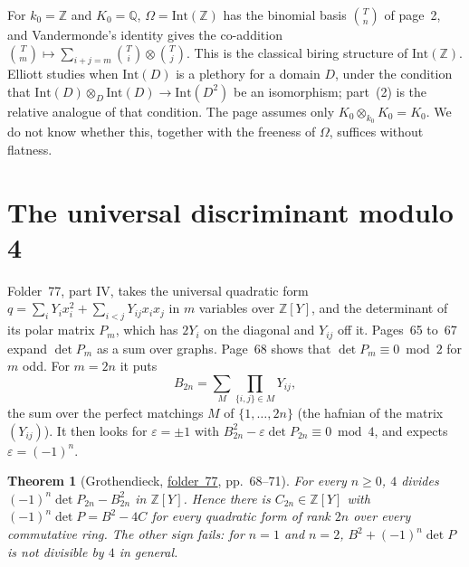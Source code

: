 \documentclass[11pt,a4paper]{amsart}
\newtheorem{theorem}{Theorem}[section]
\theoremstyle{definition}
\theoremstyle{remark}
\newcommand{\Z}{\mathbb Z}
\newcommand{\Q}{\mathbb Q}
\newcommand{\fac}[1]{\href{https://grothendieck.umontpellier.fr/#1.pdf}{folder~#1}}
\begin{document}
For $k_0 = \Z$ and $K_0 = \Q$, $\Omega = \mathrm{Int}(\Z)$ has the binomial basis $\binom Tn$ of page~2, and Vandermonde's identity gives the co-addition $\binom{T}{m} \mapsto \sum_{i+j=m}\binom Ti \otimes \binom Tj$. This is the classical biring structure of $\mathrm{Int}(\Z)$. Elliott \cite{elliott2010} studies when $\mathrm{Int}(D)$ is a plethory for a domain $D$, under the condition that $\mathrm{Int}(D) \otimes_D \mathrm{Int}(D) \to \mathrm{Int}(D^2)$ be an isomorphism; part~(2) is the relative analogue of that condition. The page assumes only $K_0 \otimes_{k_0} K_0 = K_0$. We do not know whether this, together with the freeness of $\Omega$, suffices without flatness.

\section{The universal discriminant modulo 4}\label{sec:disc}

Folder~77, part IV, takes the universal quadratic form $q = \sum_i Y_ix_i^2 + \sum_{i<j}Y_{ij}x_ix_j$ in $m$ variables over $\Z[Y]$, and the determinant of its polar matrix $P_m$, which has $2Y_i$ on the diagonal and $Y_{ij}$ off it. Pages~65 to~67 expand $\det P_m$ as a sum over graphs. Page~68 shows that $\det P_m \equiv 0 \bmod 2$ for $m$ odd. For $m = 2n$ it puts
\[
B_{2n} = \sum_M \prod_{\{i,j\} \in M} Y_{ij},
\]
the sum over the perfect matchings $M$ of $\{1, \dots, 2n\}$ (the hafnian of the matrix $(Y_{ij})$). It then looks for $\varepsilon = \pm1$ with $B_{2n}^2 - \varepsilon\det P_{2n} \equiv 0 \bmod 4$, and expects $\varepsilon = (-1)^n$.

\begin{theorem}[Grothendieck, \fac{77}, pp.~68--71]\label{thm:disc}
For every $n \ge 0$, $4$ divides $(-1)^n\det P_{2n} - B_{2n}^2$ in $\Z[Y]$. Hence there is $C_{2n} \in \Z[Y]$ with $(-1)^n\det P = B^2 - 4C$ for every quadratic form of rank $2n$ over every commutative ring. The other sign fails: for $n = 1$ and $n = 2$, $B^2 + (-1)^n\det P$ is not divisible by $4$ in general.
\end{theorem}
\end{document}

